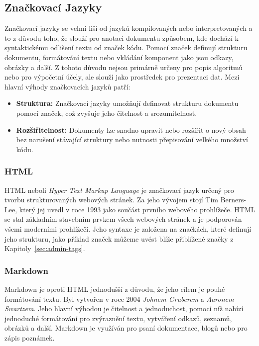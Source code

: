 \subsection{Značkovací Jazyky}
\label{subsec:languages-markup}
Značkovací jazyky se velmi liší od jazyků kompilovaných nebo interpretovaných a to z důvodu toho, že slouží pro anotaci dokumentu způsobem, kde dochází k syntaktickému odlišení textu od značek kódu. Pomocí značek definují strukturu dokumentu, formátování textu nebo vkládání komponent jako jsou odkazy, obrázky a další. Z tohoto důvodu nejsou primárně určeny pro popis algoritmů nebo pro výpočetní účely, ale slouží jako prostředek pro prezentaci dat. Mezi hlavní výhody značkovacích jazyků patří:

\begin{itemize}
    \item \textbf{Struktura:} Značkovací jazyky umožňují definovat strukturu dokumentu pomocí značek, což zvyšuje jeho čitelnost a srozumitelnost.
    \item \textbf{Rozšiřitelnost:} Dokumenty lze snadno upravit nebo rozšířit o nový obsah bez narušení stávající struktury nebo nutnosti přepisování velkého množství kódu.
\end{itemize}

\subsubsection*{HTML}
\label{subsubsec:languages-markup-html}
HTML neboli \textit{Hyper Text Markup Language} je značkovací jazyk určený pro tvorbu strukturovaných webových stránek. Za jeho vývojem stojí Tim Berners-Lee, který jej uvedl v roce 1993 jako součást prvního webového prohlížeče. HTML se stal základním stavebním prvkem všech webových stránek a je podporován všemi moderními prohlížeči. Jeho syntaxe je založena na značkách, které definují jeho strukturu, jako příklad značek můžeme uvést blíže přiblížené značky z Kapitoly~\ref{sec:admin-tags}.

\subsubsection*{Markdown}
\label{subsubsec:languages-markup-markdown}
Markdown je oproti HTML jednodušší z důvodu, že jeho cílem je pouhé formátování textu. Byl vytvořen v roce 2004 \textit{Johnem Gruberem} a \textit{Aaronem Swartzem}. Jeho hlavní výhodou je čitelnost a jednoduchost, pomocí níž nabízí jednoduché formátování pro zvýraznění textu, vytváření odkazů, seznamů, obrázků a další. Markdown je využíván pro psaní dokumentace, blogů nebo pro zápis poznámek.

